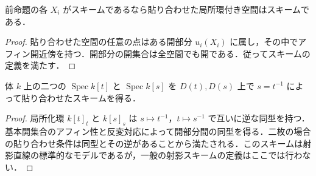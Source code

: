 \begin{prop}[スキームの貼り合わせ]
前命題の各 $X_i$ がスキームであるなら貼り合わせた局所環付き空間はスキームである．
\end{prop}
\begin{proof}
貼り合わせた空間の任意の点はある開部分 $u_i(X_i)$ に属し，その中でアフィン開近傍を持つ．開部分の開集合は全空間でも開である．従ってスキームの定義を満たす．
\end{proof}
\begin{example}[二つのアフィン直線の貼り合わせ]
体 $k$ 上の二つの $\operatorname{Spec}k[t]$ と $\operatorname{Spec}k[s]$ を $D(t),D(s)$ 上で $s=t^{-1}$ によって貼り合わせたスキームを得る．
\end{example}
\begin{proof}
局所化環 $k[t]_t$ と $k[s]_s$ は $s\mapsto t^{-1}$，$t\mapsto s^{-1}$ で互いに逆な同型を持つ．基本開集合のアフィン性と反変対応によって開部分間の同型を得る．二枚の場合の貼り合わせ条件は同型とその逆があることから満たされる．このスキームは射影直線の標準的なモデルであるが，一般の射影スキームの定義はここでは行わない．
\end{proof}
